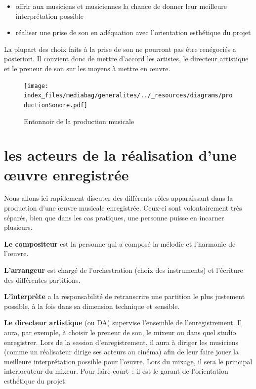 \documentclass[
  letterpaper,
  DIV=11,
  numbers=noendperiod]{scrreprt}
\providecommand{\tightlist}{%
  \setlength{\itemsep}{0pt}\setlength{\parskip}{0pt}}\usepackage{longtable,booktabs,array}
\begin{document}
\begin{itemize}
\tightlist
\item
  offrir aux musiciens et musiciennes la chance de donner leur meilleure
  interprétation possible
\item
  réaliser une prise de son en adéquation avec l'orientation esthétique
  du projet
\end{itemize}

La plupart des choix faits à la prise de son ne pourront pas être
renégociés a posteriori. Il convient donc de mettre d'accord les
artistes, le directeur artistique et le preneur de son sur les moyens à
mettre en œuvre.

\begin{figure}

{\centering \texttt{[image: index\_files/mediabag/generalites/../\_resources/diagrams/productionSonore.pdf]}

}

\caption{\label{fig-prod-mus}Entonnoir de la production musicale}

\end{figure}

\hypertarget{les-acteurs-de-la-ruxe9alisation-dune-ux153uvre-enregistruxe9e}{%
\section{les acteurs de la réalisation d'une œuvre
enregistrée}\label{les-acteurs-de-la-ruxe9alisation-dune-ux153uvre-enregistruxe9e}}

Nous allons ici rapidement discuter des différents rôles apparaissant
dans la production d'une œuvre musicale enregistrée. Ceux-ci sont
volontairement très séparés, bien que dans les cas pratiques, une
personne puisse en incarner plusieurs.

\textbf{Le compositeur} est la personne qui a composé la mélodie et
l'harmonie de l'œuvre.

\textbf{L'arrangeur} est chargé de l'orchestration (choix des
instruments) et l'écriture des différentes partitions.

\textbf{L'interprète} a la responsabilité de retranscrire une partition
le plus justement possible, à la fois dans sa dimension technique et
sensible.

\textbf{Le directeur artistique} (ou DA) supervise l'ensemble de
l'enregistrement. Il aura, par exemple, à choisir le preneur de son, le
mixeur ou dans quel studio enregistrer. Lors de la session
d'enregistrement, il aura à diriger les musiciens (comme un réalisateur
dirige ses acteurs au cinéma) afin de leur faire jouer la meilleure
interprétation possible pour l'œuvre. Lors du mixage, il sera le
principal interlocuteur du mixeur. Pour faire court~: il est le garant
de l'orientation esthétique du projet.
\end{document}
